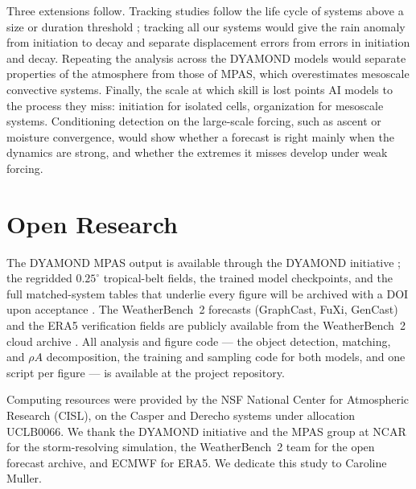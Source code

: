 \documentclass[draft]{agujournal2019}
\begin{document}
Three extensions follow. Tracking studies follow the life cycle of
systems above a size or duration threshold \cite{fiolleau2013, feng2023};
tracking all our systems would give the rain anomaly from initiation
to decay and separate displacement errors from errors in initiation and
decay. Repeating the analysis across the DYAMOND models \cite{feng2025}
would separate properties of the atmosphere from those of MPAS, which
overestimates mesoscale convective systems. Finally, the scale at which
skill is lost points AI models to the process they miss: initiation for
isolated cells, organization for mesoscale systems. Conditioning detection
on the large-scale forcing, such as ascent or moisture convergence, would
show whether a forecast is right mainly when the dynamics are strong, and
whether the extremes it misses develop under weak forcing.

\section{Open Research}
The DYAMOND MPAS output is available through the DYAMOND initiative
\cite{stevens2019}; the regridded $0.25^{\circ}$ tropical-belt fields, the
trained model checkpoints, and the full matched-system tables that underlie
every figure will be archived with a DOI upon acceptance
. The WeatherBench~2 forecasts (GraphCast, FuXi, GenCast) and the ERA5
verification fields are publicly available from the WeatherBench~2 cloud
archive \cite{rasp2024}. All analysis and figure code --- the object
detection, matching, and $\rho A$ decomposition, the training and sampling
code for both models, and one script per figure --- is available at
the project repository.

\acknowledgments
Computing resources were provided by the NSF National Center for
Atmospheric Research (CISL), on the Casper and Derecho systems under
allocation UCLB0066. We thank the DYAMOND initiative and the MPAS group at
NCAR for the storm-resolving simulation, the WeatherBench~2 team for the
open forecast archive, and ECMWF for ERA5.
We dedicate this study to Caroline Muller.


\end{document}
